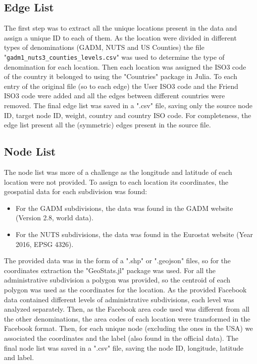 \subsection{Edge List}
The first step was to extract all the unique locations present in the data and assign a unique ID to each of them. As the location were divided in different types of denominations (GADM\cite{GADM}, NUTS\cite{NUTS} and US Counties) the file "\texttt{gadm1\_nuts3\_counties\_levels.csv}" was used to determine the type of denomination for each location.
Then each location was assigned the ISO3 code of the country it belonged to using the "Countries" package in Julia\cite{countries_package}.
To each entry of the original file (so to each edge) the User ISO3 code and the Friend ISO3 code were added and all the edges between different countries were removed.
The final edge list was saved in a ".csv" file, saving only the source node ID, target node ID, weight, country and country ISO code.
For completeness, the edge list present all the (symmetric) edges present in the source file.

\subsection{Node List}
The node list was more of a challenge as the longitude and latitude of each location were not provided.
To assign to each location its coordinates, the geospatial data for each subdivision was found:
\begin{itemize}
    \item For the GADM subdivisions, the data was found in the GADM website\cite{GADM} (Version 2.8, world data).
    \item For the NUTS subdivisions, the data was found in the Eurostat website\cite{NUTS} (Year 2016, EPSG 4326).
\end{itemize}
The provided data was in the form of a ".shp" or ".geojson" files, so for the coordinates extraction the "GeoStats.jl" package was used\cite{geostats_package}. For all the administrative subdivision a polygon was provided, so the centroid of each polygon was used as the coordinates for the location. As the provided Facebook data contained different levels of administrative subdivisions, each level was analyzed separately.
Then, as the Facebook area code used was different from all the other denominations, the area codes of each location were transformed in the Facebook format.
Then, for each unique node (excluding the ones in the USA) we associated the coordinates and the label (also found in the official data).
The final node list was saved in a ".csv" file, saving the node ID, longitude, latitude and label.

